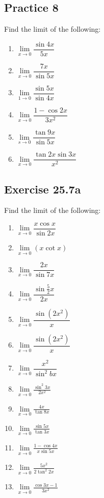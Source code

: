 \documentclass[12pt]{report}
\begin{document}
\subsection*{Practice 8}

Find the limit of the following: \setlength{\columnseprule}{1pt}
\setlength{\columnsep}{24pt}
\begin{multicols}{2}
  \begin{enumerate}
    \item $\lim\limits_{x\to0}{\dfrac{\sin4x}{5x}}$
    \item $\lim\limits_{x\to0}{\dfrac{7x}{\sin5x}}$
    \item $\lim\limits_{1\to0}{\dfrac{\sin 5x}{\sin 4x}}$
    \item $\lim\limits_{x\to0}{\dfrac{1-\cos2x}{3x^{2}}}$
    \item $\lim\limits_{s\to0}{\dfrac{\tan9x}{\sin 5x}}$
    \item $\lim\limits_{x\to0}{\dfrac{\tan2x\sin3x}{x^{2}}}$
  \end{enumerate}
\end{multicols}

\subsection*{Exercise 25.7a}

Find the limit of the following: \setlength{\columnseprule}{1pt}
\setlength{\columnsep}{24pt}
\begin{multicols}{2}
  \begin{enumerate}
    \item $\lim\limits_{x\to0}{\dfrac{x\cos x}{\sin2x}}$
    \item $\lim\limits_{x\to0}(x\cot x)$
    \item $\lim\limits_{x\to0}{\dfrac{2x}{\sin7x}}$
    \item $\lim\limits_{x\to0}{\dfrac{\sin{\frac{5}{2}}x}{2x}}$
    \item $\lim\limits_{x\to0}{\dfrac{\sin(2x^{2})}{x}}$
    \item $\lim\limits_{x\to0}{\dfrac{\sin(2x^{2})}{x}}$
    \item $\lim\limits_{x\to0}{\dfrac{x^{2}}{\sin^{2}b x}}$
    \item $\lim\limits_{x\to0}{\frac{\sin^{2}3x}{2x^{2}}}$
    \item $\lim\limits_{x\to0}{\frac{4x}{\tan8x}}$
    \item $\lim\limits_{x\to0}{\frac{\sin5x}{\tan3x}}$
    \item $\lim\limits_{x\to0}{\frac{1-\cos4x}{x\sin5x}}$
    \item $\lim\limits_{x\to0}{\frac{5x^{2}}{2\tan^{2}2x}}$
    \item $\lim\limits_{x\to0}{\frac{\cos3x-1}{3x^{2}}}$
  \end{enumerate}
\end{multicols}
\end{document}
